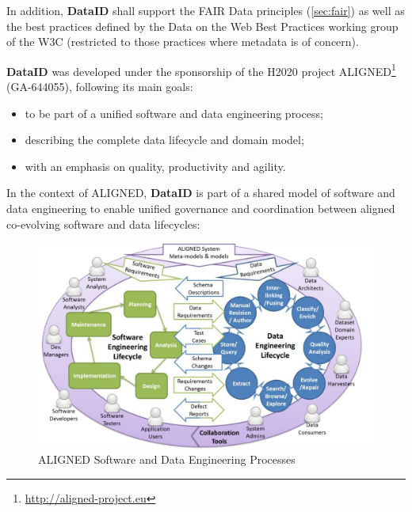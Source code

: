 \documentclass[a4paper,english,twoside,BCOR1.5cm,headsepline,DIV12,appendixprefix,final,12pt]{scrbook}
\newcommand{\dataid}{{\ttfamily\bfseries DataID}\xspace}
\newcommand\footnoteurl[1]{\footnote{\scriptsize\url{#1}}}
\begin{document}
In addition, \dataid shall support the FAIR Data principles \cite{fair2016} (\cref{sec:fair}) as well as the best practices defined by the Data on the Web Best Practices working group \cite{dwbpW3C2016} of the W3C (restricted to those practices where metadata is of concern).

\dataid was developed under the sponsorship of the H2020 project ALIGNED\footnoteurl{http://aligned-project.eu} (GA-644055), following its main goals:
\begin{itemize}
\item to be part of a unified software and data engineering process;
\item describing the complete data lifecycle and domain model;
\item with an emphasis on quality, productivity and agility.
\end{itemize}

In the context of ALIGNED, \dataid is part of a shared model of software and data engineering to enable unified governance and coordination between aligned co-evolving software and data lifecycles:

\begin{figure}[!htbp]
\centering
  \includegraphics[width=\textwidth]{images/AlignedCircles.png}
  \caption{ALIGNED Software and Data Engineering Processes}
  \label{fig:aligned}
\end{figure}
\end{document}
